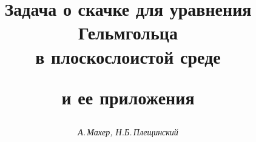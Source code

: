 




%





\newcommand{\al}{\alpha}


\newcommand{\be}{\beta}


\newcommand{\ga}{\gamma}


\newcommand{\dz}{\zeta}


\newcommand{\fy}{\varphi}


\newcommand{\De}{\Delta}


\newcommand{\Ga}{\Gamma}


\newcommand{\pa}{\partial}


\newcommand{\scpr}[2]{ \langle #1, #2 \rangle}


\newcommand{\gaxi}[1]{\ga_{#1}^+(\xi)}


\newcommand{\gaoxi}[1]{\ga_{#1}^0(\xi)}


\newcommand{\loc}{\operatorname{loc}}


\newcommand{\tts}[1]{}










\setcounter{page}{45}















\author{\it А.\,Махер, Н.Б.\,Плещинский}




\title{Задача о скачке для уравнения Гельмгольца\\ в плоскослоистой среде


и ее приложения}





